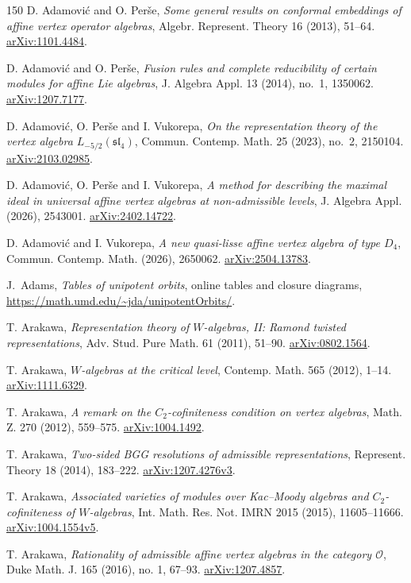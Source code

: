 \documentclass[11pt,a4paper]{amsart}
\numberwithin{equation}{section}
\theoremstyle{definition}
\theoremstyle{remark}
\newcommand{\arxiv}[1]{\href{https://arxiv.org/abs/#1}{arXiv:#1}}
\begin{document}
\begin{thebibliography}{150}
 D. Adamovi\'c and O. Per\v se,
\emph{Some general results on conformal embeddings of affine vertex operator algebras},
Algebr. Represent. Theory 16 (2013), 51--64. \arxiv{1101.4484}.

 D. Adamovi\'c and O. Per\v{s}e,
\emph{Fusion rules and complete reducibility of certain modules for affine Lie algebras},
J. Algebra Appl. 13 (2014), no.~1, 1350062. \arxiv{1207.7177}.

 D. Adamovi\'c, O. Per\v{s}e and I. Vukorepa,
\emph{On the representation theory of the vertex algebra $L_{-5/2}(\mathfrak{sl}_4)$},
Commun. Contemp. Math. 25 (2023), no.~2, 2150104. \arxiv{2103.02985}.

 D. Adamovi\'c, O. Per\v{s}e and I. Vukorepa,
\emph{A method for describing the maximal ideal in universal affine vertex algebras at non-admissible levels},
J. Algebra Appl. (2026), 2543001.
\arxiv{2402.14722}.

 D. Adamovi\'c and I. Vukorepa,
\emph{A new quasi-lisse affine vertex algebra of type $D_4$},
Commun. Contemp. Math. (2026), 2650062. \arxiv{2504.13783}.

 J.~Adams,
\emph{Tables of unipotent orbits}, online tables and closure diagrams,
\url{https://math.umd.edu/~jda/unipotentOrbits/}.


 T. Arakawa,
\emph{Representation theory of $W$-algebras, II: Ramond twisted representations},
Adv. Stud. Pure Math. 61 (2011), 51--90. \arxiv{0802.1564}.

 T. Arakawa,
\emph{$W$-algebras at the critical level},
Contemp. Math. 565 (2012), 1--14. \arxiv{1111.6329}.

 T. Arakawa,
\emph{A remark on the $C_2$-cofiniteness condition on vertex algebras},
Math. Z. 270 (2012), 559--575. \arxiv{1004.1492}.

 T. Arakawa,
\emph{Two-sided BGG resolutions of admissible representations},
Represent. Theory 18 (2014), 183--222. \arxiv{1207.4276v3}.

 T. Arakawa,
\emph{Associated varieties of modules over Kac--Moody algebras and $C_2$-cofiniteness of $W$-algebras},
Int. Math. Res. Not. IMRN 2015 (2015), 11605--11666. \arxiv{1004.1554v5}.

 T. Arakawa,
\emph{Rationality of admissible affine vertex algebras in the category $\mathcal O$},
Duke Math. J. 165 (2016), no. 1, 67--93. \arxiv{1207.4857}.


\end{thebibliography}
\end{document}
